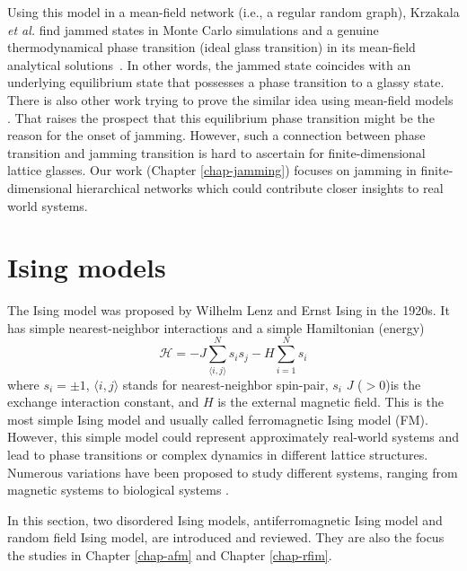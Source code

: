 Using this model in a mean-field network 
(i.e., a regular random graph), Krzakala \textit{et al.} find
jammed states in Monte Carlo simulations and a genuine thermodynamical
phase transition (ideal glass transition) in its mean-field analytical
solutions~\cite{Krzakala2008}. In other words, the jammed state coincides
with an underlying equilibrium state that possesses a phase transition
to a glassy state. There is also other work trying to prove the similar idea using mean-field models \cite{Rivoire03,berthier2011theory, Parisi2010}. That raises the prospect that this equilibrium phase transition might be the reason for the onset of jamming. However, such a connection between phase transition and jamming transition is hard to ascertain for finite-dimensional lattice glasses. Our work (Chapter \ref{chap-jamming}) focuses on jamming in finite-dimensional hierarchical networks which could contribute closer insights to real world systems.



\section{Ising models}
The Ising model was proposed by Wilhelm Lenz and Ernst Ising \cite{ising1925contribution, brush1967history} in the 1920s. It has simple nearest-neighbor interactions and a simple Hamiltonian (energy)
\begin{equation}
\mathcal{H}=-J \sum_{\langle i, j\rangle}^N s_i s_j - H \sum_{i=1}^N s_i
\label{eq:intro-ising}
\end{equation}
where $s_i=\pm1$, $\langle i, j\rangle$ stands for nearest-neighbor spin-pair, $s_i$ $J$ ($>0$)is the exchange interaction constant, and $H$ is the external magnetic field. This is the most simple Ising model and usually called ferromagnetic Ising model (FM).
However, this simple model could represent approximately real-world systems and lead to phase transitions \cite{onsager1944} or complex dynamics \cite{Fredrickson1984} in different lattice structures. 
Numerous variations have been proposed to study different systems, ranging from magnetic systems \cite{blundell2001magnetism} to biological systems \cite{hopfield1982neural}.

In this section, two disordered Ising models, antiferromagnetic Ising model and random field Ising model,  are introduced and reviewed. They are also the focus the studies in Chapter \ref{chap-afm} and Chapter \ref{chap-rfim}.
